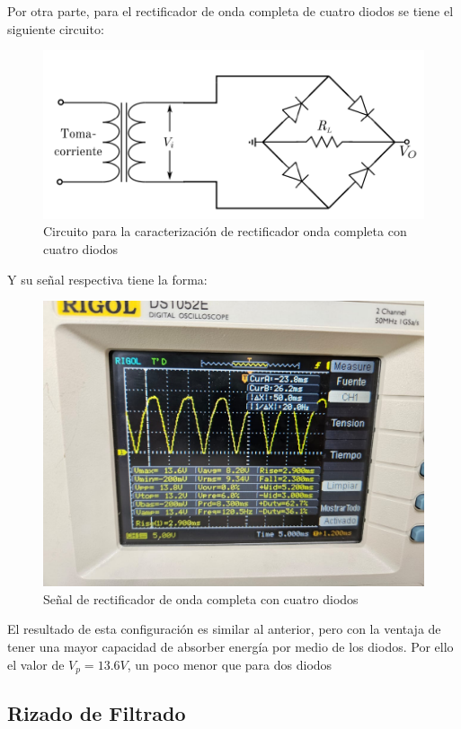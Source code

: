 \documentclass[10pt,letterpaper]{article}
\begin{document}
Por otra parte, para el rectificador de onda completa de cuatro diodos se tiene el siguiente circuito:
\begin{figure}[H]
	\centering
	\includegraphics[scale=1]{OndaCompleta4.png}
	\caption{Circuito para la caracterización de rectificador onda completa con cuatro diodos}
	\label{fig:4}
\end{figure}
Y su señal respectiva tiene la forma:

\begin{figure}[H]
	\centering
	\includegraphics[scale=.35]{Osc_OndaCompleta4D.jpg}
	\caption{Señal de rectificador de onda completa con cuatro diodos}
	\label{fig:4D}
\end{figure}

El resultado de esta configuración es similar al anterior, pero con la ventaja de tener una mayor
capacidad de absorber energía por medio de los diodos. Por ello el valor de $V_p=13.6 V$, un poco menor que para dos diodos\\


\subsection{Rizado de Filtrado}
\end{document}
